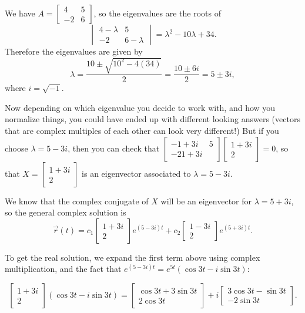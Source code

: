\documentclass[letter, 12pt]{article}
\newcounter{probnum}
\newenvironment{problems}{
\begin{list}{\arabic{probnum}.}{\usecounter{probnum}}
}{
\end{list}
}
\begin{document}
\begin{problems}
\bigskip

We have $\displaystyle A = \begin{bmatrix} 4&5\\-2&6\end{bmatrix}$, so the eigenvalues are the roots of
\[\begin{vmatrix}4-\lambda & 5\\-2&6-\lambda\end{vmatrix} = \lambda^2-10\lambda+34.\]
Therefore the eigenvalues are given by
\[\lambda = \frac{10\pm\sqrt{10^2-4(34)}}{2} = \frac{10\pm 6i}{2} = 5\pm 3i,\]
where $i = \sqrt{-1}$.

Now depending on which eigenvalue you decide to work with, and how you normalize things, you could have ended up with different looking answers (vectors that are complex multiples of each other can look very different!)  But if you choose $\lambda  = 5-3i$, then you can check that $\begin{bmatrix}-1+3i & 5\\-2 1+3i\end{bmatrix}\begin{bmatrix}1+3i\\2\end{bmatrix} = 0$, so that $X = \begin{bmatrix}1+3i\\2\end{bmatrix}$ is an eigenvector associated to $\lambda = 5-3i$.

We know that the complex conjugate of $X$ will be an eigenvector for $\lambda  = 5+3i$, so the general complex solution is
\[\vec{r}(t) = c_1\begin{bmatrix}1+3i\\2\end{bmatrix}e^{(5-3i)t}+c_2\begin{bmatrix}1-3i\\2\end{bmatrix}e^{(5+3i)t}.\]

To get the real solution, we expand the first term above using complex multiplication, and the fact that $e^{(5-3i)t} = e^{5t}(\cos 3t - i\sin 3t)$:

\[\begin{bmatrix}1+3i\\2\end{bmatrix}(\cos 3t - i\sin 3t) = \begin{bmatrix}\cos 3t + 3\sin 3t\\2\cos 3t\end{bmatrix} + i\begin{bmatrix}3\cos 3t - \sin 3t\\-2\sin 3t\end{bmatrix}.\]


\end{problems}
\end{document}
